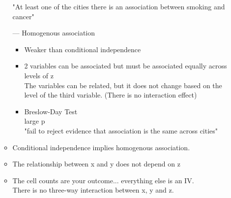 \documentclass[12 pt]{article}
\begin{document}
\begin{itemize}
\begin{itemize}
        "At least one of the cities there is an association between smoking and cancer"\\
        \item [---] Homogenous association
        \begin{itemize}
            \item Weaker than conditional independence
            \item 2 variables can be associated but must be associated equally across levels of z\\
            The variables can be related, but it does not change based on the level of the third variable. (There is no interaction effect)\\
            \item Breslow-Day Test \\
            large p\\
            "fail to reject evidence that association is the same across cities"
        \end{itemize}
        \item Conditional independence implies homogenous association.
        \item The relationship between x and y does not depend on z 
        \item The cell counts are your outcome... everything else is an IV.\\ 
        There is no three-way interaction between x, y and z.
    \end{itemize}

\end{itemize}
\end{document}

